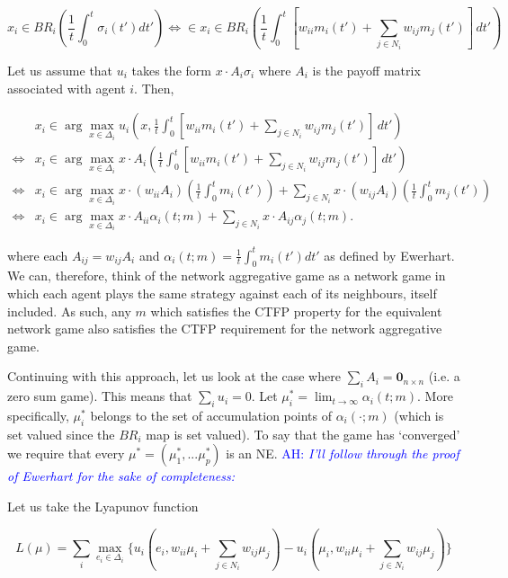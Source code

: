 \documentclass{article}
\theoremstyle{definition}
\newcommand{\ah}[1]{\textcolor{blue}{AH: \textit{#1}}}
\begin{document}
	\begin{equation*}
		x_i \in BR_i \left( \frac{1}{t} \int_{0}^{t} \sigma_i(t') dt' \right) \iff  \in x_i\in BR_i \left( \frac{1}{t} \int_{0}^{t} [w_{ii} m_i(t') + \sum_{j \in N_i} w_{ij} m_j(t')] \, dt' \right)
	\end{equation*}
	
	Let us assume that $u_i$ takes the form $x \cdot A_i \sigma_i$ where $A_i$ is the payoff matrix associated with agent $i$. Then,
	
	\begin{align}
		& x_i \in \arg\max_{x \in \Delta_i} u_i(x,\frac{1}{t} \int_{0}^{t} [w_{ii} m_i(t') + \sum_{j \in N_i} w_{ij} m_j(t')] \, dt') \nonumber \\
		\iff & x_i \in \arg\max_{x \in \Delta_i} x \cdot A_i \left(\frac{1}{t} \int_{0}^{t} [w_{ii} m_i(t') + \sum_{j \in N_i} w_{ij} m_j(t')] \, dt' \right) \nonumber \\
		\iff & x_i \in \arg \max_{x \in \Delta_i} x \cdot (w_{ii} A_i) \left( \frac{1}{t} \int_{0}^{t} m_i(t')\right) + \sum_{j \in N_i} x \cdot (w_{ij} A_i) \left( \frac{1}{t} \int_{0}^{t} m_j(t')\right) \nonumber \\
		\iff & x_i \in \arg \max_{x \in \Delta_i} x \cdot A_{ii} \alpha_i(t; m) + \sum_{j \in N_i} x \cdot A_{ij} \alpha_j(t; m).
	\end{align}
	
	where each $A_{ij} = w_{ij} A_i$ and $\alpha_i(t; m) =\frac{1}{t} \int_{0}^{t} m_i(t') dt'$ as defined by Ewerhart. We can, therefore, think of the network aggregative game as a network game in which each agent plays the same strategy against each of its neighbours, itself included. As such, any $m$ which satisfies the CTFP property for the equivalent network game also satisfies the CTFP requirement for the network aggregative game. 
	
	Continuing with this approach, let us look at the case where $\sum_i A_i = \textbf{0}_{n\times n}$ (i.e. a zero sum game). This means that $\sum_i u_i = 0$. Let $\mu_i^* = \lim_{t \rightarrow \infty} \alpha_i(t; m)$. More specifically, $\mu_i^*$ belongs to the set of accumulation points of $\alpha_i(\cdot; m)$ (which is set valued since the $BR_i$ map is set valued). To say that the game has `converged' we require that every $\mu^* = (\mu_1^*, ... \mu_p^*)$ is an NE. \ah{I'll follow through the proof of Ewerhart for the sake of completeness: }
	
	Let us take the Lyapunov function
	
	\begin{equation}
		L(\mu) = \sum_i \max_{e_i \in \Delta_i} \{u_i(e_i, w_{ii} \mu_i + \sum_{j \in N_i} w_{ij} \mu_j) - u_i(\mu_i, w_{ii} \mu_i + \sum_{j \in N_i} w_{ij} \mu_j) \}
	\end{equation}
	
\end{document}
